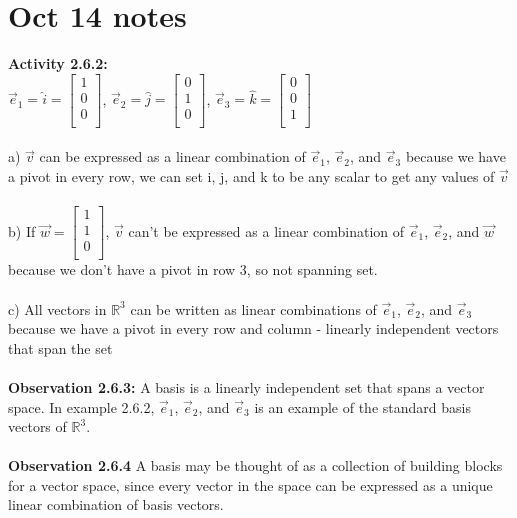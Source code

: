 \documentclass{article}
\begin{document}
\section*{Oct 14 notes}
\textbf{Activity 2.6.2:}\\
$\vec{e}_{1} = \hat{i} = \begin{bmatrix} 
1\\ 
0\\
0\\
\end{bmatrix}$, $\vec{e}_{2} = \hat{j} =\begin{bmatrix} 
0\\ 
1\\
0\\
\end{bmatrix}$, $\vec{e}_{3} = \hat{k} =\begin{bmatrix} 
0\\ 
0\\
1\\
\end{bmatrix}$\\
\\
a) $\vec{v}$ can be expressed as a linear combination of $\vec{e}_{1}$, $\vec{e}_{2}$, and $\vec{e}_{3}$ because we have a pivot in every row, we can set i, j, and k to be any scalar to get any values of $\vec{v}$ \\
\\
b) If $\vec{w} = \begin{bmatrix} 
1\\ 
1\\
0\\
\end{bmatrix}$, $\vec{v}$ can't be expressed as a linear combination of $\vec{e}_{1}$, $\vec{e}_{2}$, and $\vec{w}$ because we don't have a pivot in row 3, so not spanning set. \\
\\
c) All vectors in $\mathbb{R}^{3}$ can be written as linear combinations of $\vec{e}_{1}$, $\vec{e}_{2}$, and $\vec{e}_{3}$  because we have a pivot in every row and column - linearly independent vectors that span the set\\
\\
\textbf{Observation 2.6.3:} A basis is a linearly independent set that spans a vector space. In example 2.6.2, $\vec{e}_{1}$, $\vec{e}_{2}$, and $\vec{e}_{3}$ is an example of the standard basis vectors of $\mathbb{R}^{3}$.\\
\\
\textbf{Observation 2.6.4} A basis may be thought of as a collection of building blocks for a vector space, since every vector in the space can be expressed as a unique linear combination of basis vectors.\\
\end{document}

